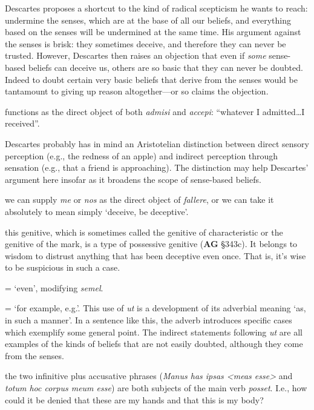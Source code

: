 \prenotes

Descartes proposes a shortcut to the kind of radical scepticism he wants to reach: undermine the senses, which are at the base of all our beliefs, and everything based on the senses will be undermined at the same time. His argument against the senses is brisk: they sometimes deceive, and therefore they can never be trusted. However, Descartes then raises an objection that even if \textit{some} sense-based beliefs can deceive us, others are so basic that they can never be doubted. Indeed to doubt certain very basic beliefs that derive from the senses would be tantamount to giving up reason altogether---or so claims the objection.

 functions as the direct object of both \textit{admisi} and \textit{accepi}: ``whatever I admitted\dots I received''.

 Descartes probably has in mind an Aristotelian distinction between direct sensory perception (e.g., the redness of an apple) and indirect perception through sensation (e.g., that a friend is approaching). The distinction may help Descartes' argument here insofar as it broadens the scope of sense-based beliefs. 

 we can supply \textit{me} or \textit{nos} as the direct object of \textit{fallere}, or we can take it absolutely to mean simply `deceive, be deceptive'.

 this genitive, which is sometimes called the genitive of characteristic or the genitive of the mark, is a type of possessive genitive (\textbf{AG} §343c). It belongs to wisdom to distrust anything that has been deceptive even once. That is, it's wise to be suspicious in such a case.

 = `even', modifying \textit{semel}.

 = `for example, e.g.'. This use of \textit{ut} is a development of its adverbial meaning `as, in such a manner'. In a sentence like this, the adverb introduces specific cases which exemplify some general point. The indirect statements following \textit{ut} are all examples of the kinds of beliefs that are not easily doubted, although they come from the senses.

 the two infinitive plus accusative phrases (\textit{Manus has ipsas <meas esse>} and \textit{totum hoc corpus meum esse}) are both subjects of the main verb \textit{posset}. I.e., how could it be denied that these are my hands and that this is my body?


